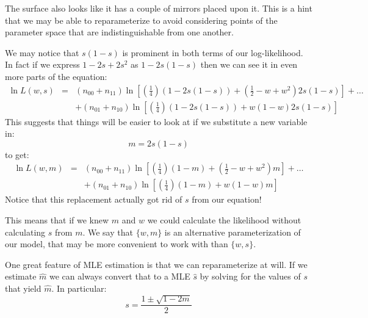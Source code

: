 \documentclass[11pt]{article}
\begin{document}
The surface also looks like it has a couple of mirrors placed upon it.  This is a hint that we may be able to reparameterize to avoid considering points of the parameter space that are indistinguishable from one another.





We may notice that $s(1-s)$ is prominent in both terms of our log-likelihood. In fact if we express $1-2s+2s^2$ as $1-2s(1-s)$ then we can see it in even more parts of the equation:
\begin{eqnarray*} 
\ln L(w,s) & = & (n_{00} + n_{11})\ln\left[\left(\frac{1}{4}\right)(1-2s(1-s)) + (\frac{1}{2} -w +w^2) 2s(1-s)\right] + \ldots \\
	& & +  (n_{01} + n_{10})\ln\left[\left(\frac{1}{4}\right)(1-2s(1-s)) + w(1-w)2s(1-s)\right] 
\end{eqnarray*}
This suggests that things will be easier to look at if we substitute a new variable in:
$$ m = 2s(1-s)$$
to get:
\begin{eqnarray*} 
\ln L(w,m) & = & (n_{00} + n_{11})\ln\left[\left(\frac{1}{4}\right)(1-m) + (\frac{1}{2} -w +w^2) m\right] + \ldots \\
	& & +  (n_{01} + n_{10})\ln\left[\left(\frac{1}{4}\right)(1-m) + w(1-w)m\right] 
\end{eqnarray*}
Notice that this replacement actually got rid of $s$ from our equation!

This means that if we knew $m$ and $w$ we could calculate the likelihood without calculating $s$ from $m$.
We say that $\{w,m\}$ is an alternative parameterization of our model, that may be more convenient to work with than $\{w,s\}$.

One great feature of MLE estimation is that we can reparameterize at will. If we estimate  $\hat m$ we can always convert that to a MLE $\hat s$ by solving for the values of $s$ that yield $\hat m$. 
In particular:
\begin{equation}s = \frac{1 \pm \sqrt{1 - 2 m}}{2} \label{EqnSFromM}
\end{equation}
\end{document}
